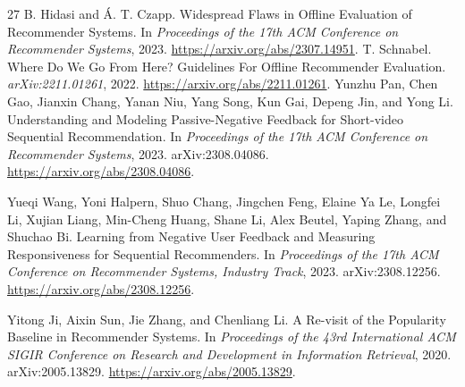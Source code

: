 \documentclass[11pt]{article}
\begin{document}
\begin{thebibliography}{27}
 B. Hidasi and {\'A}. T. Czapp. Widespread Flaws in Offline Evaluation of Recommender Systems. In \emph{Proceedings of the 17th ACM Conference on Recommender Systems}, 2023. \url{https://arxiv.org/abs/2307.14951}.
 T. Schnabel. Where Do We Go From Here? Guidelines For Offline Recommender Evaluation. \emph{arXiv:2211.01261}, 2022. \url{https://arxiv.org/abs/2211.01261}.
Yunzhu Pan, Chen Gao, Jianxin Chang, Yanan Niu, Yang Song, Kun Gai, Depeng Jin, and
Yong Li.
\newblock Understanding and Modeling Passive-Negative Feedback for Short-video
  Sequential Recommendation.
\newblock In {\em Proceedings of the 17th ACM Conference on Recommender Systems}, 2023.
\newblock arXiv:2308.04086. \url{https://arxiv.org/abs/2308.04086}.

Yueqi Wang, Yoni Halpern, Shuo Chang, Jingchen Feng, Elaine Ya Le, Longfei Li, Xujian
Liang, Min-Cheng Huang, Shane Li, Alex Beutel, Yaping Zhang, and Shuchao Bi.
\newblock Learning from Negative User Feedback and Measuring Responsiveness for
  Sequential Recommenders.
\newblock In {\em Proceedings of the 17th ACM Conference on Recommender Systems,
  Industry Track}, 2023.
\newblock arXiv:2308.12256. \url{https://arxiv.org/abs/2308.12256}.

Yitong Ji, Aixin Sun, Jie Zhang, and Chenliang Li.
\newblock A Re-visit of the Popularity Baseline in Recommender Systems.
\newblock In {\em Proceedings of the 43rd International ACM SIGIR Conference on
  Research and Development in Information Retrieval}, 2020.
\newblock arXiv:2005.13829. \url{https://arxiv.org/abs/2005.13829}.

\end{thebibliography}
\end{document}
